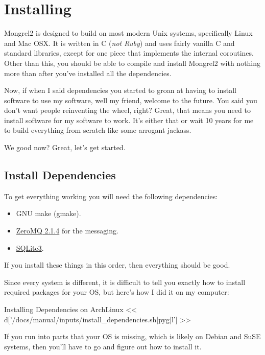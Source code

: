 \chapter{Installing}

Mongrel2 is designed to build on most modern Unix systems, specifically Linux
and Mac OSX.  It is written in C (\emph{not Ruby}) and uses fairly vanilla
C and standard libraries, except for one piece that implements the internal
coroutines.  Other than this, you should be able to compile and install Mongrel2
with nothing more than  after you've installed
all the dependencies.

Now, if when I said dependencies you started to groan at having to install
software to use my software, well my friend, welcome to the future.  You
said you don't want people reinventing the wheel, right?  Great, that means
you need to install software for my software to work.  It's either that or
wait 10 years for me to build everything from scratch like some arrogant
jackass.

We good now?  Great, let's get started.

\section{Install Dependencies}

To get everything working you will need the following dependencies:

\begin{itemize}
\item GNU make (gmake).
\item \href{http://zeromq.org}{ZeroMQ 2.1.4} for the messaging.
\item \href{http://www.sqlite.org/}{SQLite3}.
\end{itemize}

If you install these things in this order, then everything should be good.

Since every system is different, it is difficult to tell you exactly how to
install required packages for your OS, but here's how I did it on my computer:

\begin{code}{Installing Dependencies on ArchLinux}
<< d['/docs/manual/inputs/install_dependencies.sh|pyg|l'] >>
\end{code}

If you run into parts that your OS is missing, which is likely on
Debian and SuSE systems, then you'll have to go and figure out
how to install it.

